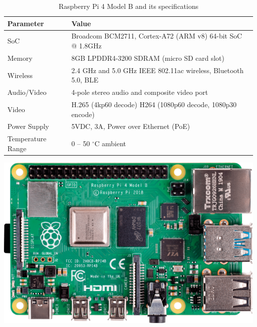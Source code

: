\begin{table}[h]
    \begin{minipage}{0.6\textwidth}
        \centering
        \renewcommand{\arraystretch}{2.0}
        \setlength{\tabcolsep}{4.4pt}
        \footnotesize
        \begin{tabular}{|p{2.9cm}|p{6.4cm}|}
          \hline
          \rowcolor[gray]{0.8} 
          \textbf{Parameter} & \textbf{Value} \\
          \hline
          SoC & Broadcom BCM2711, Cortex-A72 (ARM v8) 64-bit SoC @ 1.8GHz \\
          \hline
          Memory & 8GB LPDDR4-3200 SDRAM (micro SD card slot) \\
          \hline
          Wireless & 2.4 GHz and 5.0 GHz IEEE 802.11ac wireless, Bluetooth 5.0, BLE \\
          \hline
          Audio/Video & 4-pole stereo audio and composite video port \\
          \hline
          Video & H.265 (4kp60 decode) \newline H264 (1080p60 decode, 1080p30 encode) \\
          \hline
          Power Supply & 5VDC, 3A, Power over Ethernet (PoE) \\
          \hline
          Temperature Range & 0 – 50 $^\circ$C ambient \\
          \hline
        \end{tabular}
    \end{minipage}
    \begin{minipage}{0.47\textwidth}
        \centering
        \includegraphics[width=\linewidth, angle=270]{pics/RPI4B.png}
    \end{minipage}\hfill
    \caption{Raspberry Pi 4 Model B and its specifications}\label{tab:rpi4_specs}
\end{table}



